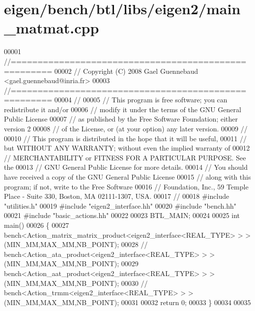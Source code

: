 \hypertarget{eigen_2bench_2btl_2libs_2eigen2_2main__matmat_8cpp_source}{}\section{eigen/bench/btl/libs/eigen2/main\+\_\+matmat.cpp}
\label{eigen_2bench_2btl_2libs_2eigen2_2main__matmat_8cpp_source}

\begin{DoxyCode}
00001 \textcolor{comment}{//=====================================================}
00002 \textcolor{comment}{// Copyright (C) 2008 Gael Guennebaud <gael.guennebaud@inria.fr>}
00003 \textcolor{comment}{//=====================================================}
00004 \textcolor{comment}{//}
00005 \textcolor{comment}{// This program is free software; you can redistribute it and/or}
00006 \textcolor{comment}{// modify it under the terms of the GNU General Public License}
00007 \textcolor{comment}{// as published by the Free Software Foundation; either version 2}
00008 \textcolor{comment}{// of the License, or (at your option) any later version.}
00009 \textcolor{comment}{//}
00010 \textcolor{comment}{// This program is distributed in the hope that it will be useful,}
00011 \textcolor{comment}{// but WITHOUT ANY WARRANTY; without even the implied warranty of}
00012 \textcolor{comment}{// MERCHANTABILITY or FITNESS FOR A PARTICULAR PURPOSE.  See the}
00013 \textcolor{comment}{// GNU General Public License for more details.}
00014 \textcolor{comment}{// You should have received a copy of the GNU General Public License}
00015 \textcolor{comment}{// along with this program; if not, write to the Free Software}
00016 \textcolor{comment}{// Foundation, Inc., 59 Temple Place - Suite 330, Boston, MA  02111-1307, USA.}
00017 \textcolor{comment}{//}
00018 \textcolor{preprocessor}{#include "utilities.h"}
00019 \textcolor{preprocessor}{#include "eigen2\_interface.hh"}
00020 \textcolor{preprocessor}{#include "bench.hh"}
00021 \textcolor{preprocessor}{#include "basic\_actions.hh"}
00022 
00023 BTL\_MAIN;
00024 
00025 \textcolor{keywordtype}{int} main()
00026 \{
00027   bench<Action\_matrix\_matrix\_product<eigen2\_interface<REAL\_TYPE> > >(MIN\_MM,MAX\_MM,NB\_POINT);
00028 \textcolor{comment}{//   bench<Action\_ata\_product<eigen2\_interface<REAL\_TYPE> > >(MIN\_MM,MAX\_MM,NB\_POINT);}
00029   bench<Action\_aat\_product<eigen2\_interface<REAL\_TYPE> > >(MIN\_MM,MAX\_MM,NB\_POINT);
00030 \textcolor{comment}{//   bench<Action\_trmm<eigen2\_interface<REAL\_TYPE> > >(MIN\_MM,MAX\_MM,NB\_POINT);}
00031 
00032   \textcolor{keywordflow}{return} 0;
00033 \}
00034 
00035 
\end{DoxyCode}
